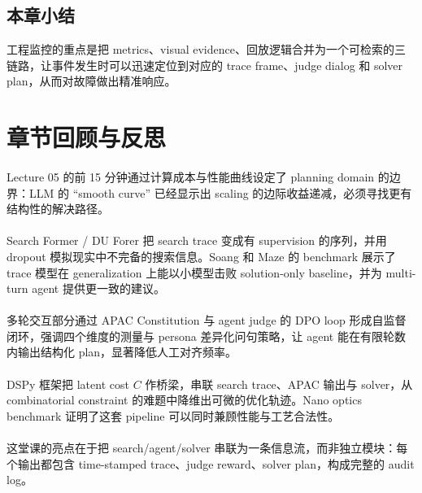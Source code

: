 \documentclass[a4paper]{article}
\begin{document}
\subsection{本章小结}
工程监控的重点是把 metrics、visual evidence、回放逻辑合并为一个可检索的三链路，让事件发生时可以迅速定位到对应的 trace frame、judge dialog 和 solver plan，从而对故障做出精准响应。

\section{章节回顾与反思}

\paragraph{}
Lecture 05 的前 15 分钟通过计算成本与性能曲线设定了 planning domain 的边界：LLM 的 ``smooth curve'' 已经显示出 scaling 的边际收益递减，必须寻找更有结构性的解决路径。

\paragraph{}
Search Former / DU Forer 把 search trace 变成有 supervision 的序列，并用 dropout 模拟现实中不完备的搜索信息。Soang 和 Maze 的 benchmark 展示了 trace 模型在 generalization 上能以小模型击败 solution-only baseline，并为 multi-turn agent 提供更一致的建议。

\paragraph{}
多轮交互部分通过 APAC Constitution 与 agent judge 的 DPO loop 形成自监督闭环，强调四个维度的测量与 persona 差异化问句策略，让 agent 能在有限轮数内输出结构化 plan，显著降低人工对齐频率。

\paragraph{}
DSPy 框架把 latent cost \(C\) 作桥梁，串联 search trace、APAC 输出与 solver，从 combinatorial constraint 的难题中降维出可微的优化轨迹。Nano optics benchmark 证明了这套 pipeline 可以同时兼顾性能与工艺合法性。

\paragraph{}
这堂课的亮点在于把 search/agent/solver 串联为一条信息流，而非独立模块：每个输出都包含 time-stamped trace、judge reward、solver plan，构成完整的 audit log。
\end{document}
